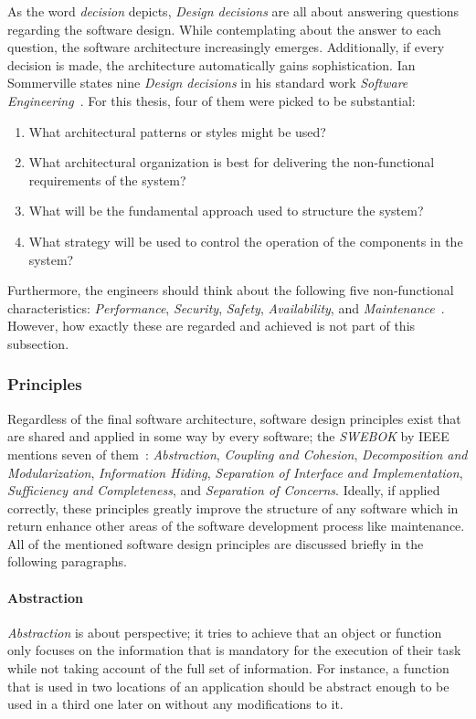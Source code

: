 \documentclass[12pt,a4paper,twoside]{report}
\begin{document}
As the word \textit{decision} depicts, \textit{Design decisions} are all about
answering questions regarding the software design. While contemplating about
the answer to each question, the software architecture increasingly emerges.
Additionally, if every decision is made, the architecture automatically gains
sophistication. Ian Sommerville states nine \textit{Design decisions} in his
standard work \textit{Software Engineering}~\cite{sommerville-se}.
For this thesis, four of them were picked to be substantial:
\begin{enumerate}
\item What architectural patterns or styles might be used?
\item What architectural organization is best for delivering the non-functional requirements of the system?
\item What will be the fundamental approach used to structure the system?
\item What strategy will be used to control the operation of the components in the system?
\end{enumerate}
Furthermore, the engineers should think about the following five non-functional characteristics:
\textit{Performance}, \textit{Security}, \textit{Safety}, \textit{Availability},
and \textit{Maintenance}~\cite{sommerville-se}. However, how exactly these are
regarded and achieved is not part of this subsection.


\subsubsection{Principles}

Regardless of the final software architecture, software design principles exist
that are shared and applied in some way by every software; the \textit{SWEBOK} by IEEE
mentions seven of them~\cite{swebok}: \textit{Abstraction}, \textit{Coupling and Cohesion},
\textit{Decomposition and Modularization}, \textit{Information Hiding},
\textit{Separation of Interface and Implementation},
\textit{Sufficiency and Completeness}, and \textit{Separation of Concerns}.
Ideally, if applied correctly, these principles greatly improve the structure
of any software which in return enhance other areas of the
software development process like maintenance. All of the mentioned
software design principles are discussed briefly in the following paragraphs.

\paragraph{Abstraction}
\textit{Abstraction} is about perspective; it tries to achieve that an object or
function only focuses on the information that is mandatory for the execution of
their task while not taking account of the full set of information.
For instance, a function that is used in two locations of an application
should be abstract enough to be used in a third one later on without
any modifications to it.
\end{document}

